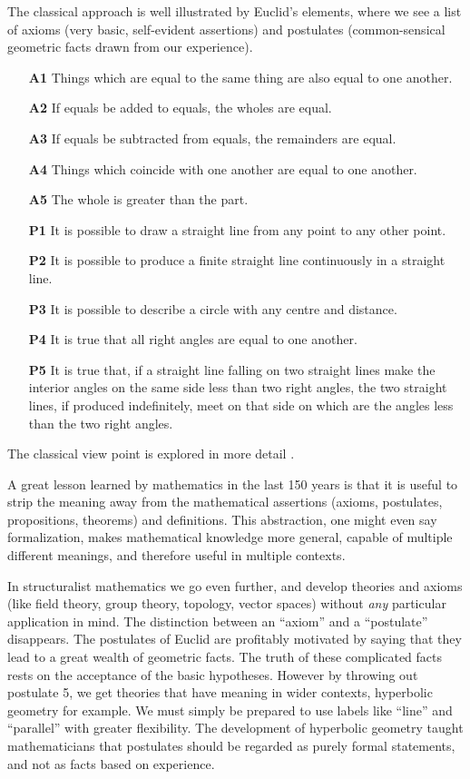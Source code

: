 \documentclass[12pt]{article}
\begin{document}
The classical approach is well illustrated by Euclid's elements, where
we see a list of axioms (very basic, self-evident assertions) and
postulates (common-sensical geometric facts drawn from our
experience).
\begin{itemize}
\item[\bf A1] Things which are equal to the same thing are also equal to one
another.  
\item[\bf A2] If equals be added to equals, the wholes are equal.
\item[\bf A3] If equals be subtracted from equals, the remainders are
  equal.
\item[\bf A4] Things which coincide with one another are equal to one
  another.
\item[\bf A5] The whole is greater than the part.
\item[\bf P1] It is possible to
draw a straight line from any point to any other point.
\item[\bf P2] It is possible to produce a finite straight line continuously in a
straight line.
\item[\bf P3] It is possible to describe a circle with any
centre and distance.
\item[\bf P4] It is true that all right angles are
equal to one another.
\item[\bf P5] It is true that, if a straight line
falling on two straight lines make the interior angles on the same
side less than two right angles, the two straight lines, if produced
indefinitely, meet on that side on which are the angles less than the
two right angles.
\end{itemize}
The classical view point is explored in more detail .


A great lesson learned by mathematics in the last 150 years is that it
is useful to strip the meaning away from the mathematical assertions
(axioms, postulates, propositions, theorems) and definitions. This
abstraction, one might even say formalization, makes mathematical
knowledge more general, capable of multiple different meanings, and
therefore useful in multiple contexts.


In structuralist mathematics we go even further, and develop theories
and axioms (like field theory, group theory, topology, vector spaces)
without \emph{any} particular application in mind.  The distinction
between an ``axiom'' and a ``postulate'' disappears. The postulates of
Euclid are profitably motivated by saying that they lead to a great
wealth of geometric facts.  The truth of these complicated facts rests
on the acceptance of the basic hypotheses.  However by throwing out
postulate 5, we get theories that have meaning in wider contexts,
hyperbolic geometry for example. We must simply be prepared to use
labels like ``line'' and ``parallel'' with greater flexibility.  The
development of hyperbolic geometry taught mathematicians that
postulates should be regarded as purely formal statements, and not as
facts based on experience.
\end{document}
